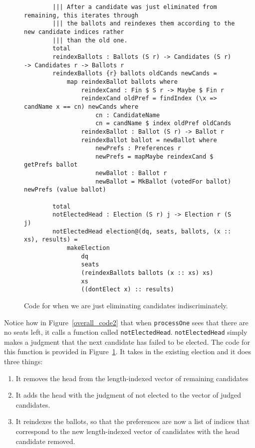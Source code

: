 \begin{figure}[ht!!!!!!!!]
	\caption{Code for when we are just eliminating candidates indiscriminately.}
	\label{not_elected_head_code}
    \begin{lstlisting}
        ||| After a candidate was just eliminated from remaining, this iterates through
        ||| the ballots and reindexes them according to the new candidate indices rather
        ||| than the old one. 
        total
        reindexBallots : Ballots (S r) -> Candidates (S r) -> Candidates r -> Ballots r
        reindexBallots {r} ballots oldCands newCands = 
            map reindexBallot ballots where
                reindexCand : Fin $ S r -> Maybe $ Fin r
                reindexCand oldPref = findIndex (\x => candName x == cn) newCands where
                    cn : CandidateName
                    cn = candName $ index oldPref oldCands
                reindexBallot : Ballot (S r) -> Ballot r
                reindexBallot ballot = newBallot where
                    newPrefs : Preferences r
                    newPrefs = mapMaybe reindexCand $ getPrefs ballot
                    newBallot : Ballot r
                    newBallot = MkBallot (votedFor ballot) newPrefs (value ballot)

        total
        notElectedHead : Election (S r) j -> Election r (S j)
        notElectedHead election@(dq, seats, ballots, (x :: xs), results) = 
            makeElection 
                dq 
                seats 
                (reindexBallots ballots (x :: xs) xs)
                xs
                ((dontElect x) :: results)
    \end{lstlisting}
\end{figure}

Notice how in Figure~\ref{overall_code2} that when \texttt{processOne} sees that
there are no seats left, it calls a function called \texttt{notElectedHead}.
\texttt{notElectedHead} simply makes a judgment that the next candidate has
failed to be elected. The code for this function is provided in
Figure~\ref{not_elected_head_code}. It takes in the existing election and it does
three things: 

\begin{enumerate}
    \item It removes the head from the length-indexed vector of remaining candidates
    \item It adds the head with the judgment of not elected to the vector of judged candidates. 
    \item It reindexes the ballots, so that the preferences are now a list of
    indices that correspond to the new length-indexed vector of candidates with
    the head candidate removed. 
\end{enumerate}

